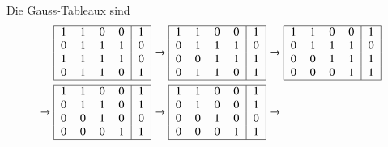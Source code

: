 \begin{loesung}
\begin{teilaufgaben}
\item
Die Gauss-Tableaux sind
\begin{align*}
\begin{tabular}{|>{$}c<{$}>{$}c<{$}>{$}c<{$}>{$}c<{$}|>{$}c<{$}|}
\hline
   1 & 1 & 0 & 0 &  1\\
   0 & 1 & 1 & 1 &  0\\
   1 & 1 & 1 & 1 &  0\\
   0 & 1 & 1 & 0 &  1\\
\hline
\end{tabular}
&\to
\begin{tabular}{|>{$}c<{$}>{$}c<{$}>{$}c<{$}>{$}c<{$}|>{$}c<{$}|}
\hline
   1 & 1 & 0 & 0 &  1\\
   0 & 1 & 1 & 1 &  0\\
   0 & 0 & 1 & 1 &  1\\
   0 & 1 & 1 & 0 &  1\\
\hline
\end{tabular}
\to
\begin{tabular}{|>{$}c<{$}>{$}c<{$}>{$}c<{$}>{$}c<{$}|>{$}c<{$}|}
\hline
   1 & 1 & 0 & 0 &  1\\
   0 & 1 & 1 & 1 &  0\\
   0 & 0 & 1 & 1 &  1\\
   0 & 0 & 0 & 1 &  1\\
\hline
\end{tabular}
\\
\to
\begin{tabular}{|>{$}c<{$}>{$}c<{$}>{$}c<{$}>{$}c<{$}|>{$}c<{$}|}
\hline
   1 & 1 & 0 & 0 &  1\\
   0 & 1 & 1 & 0 &  1\\
   0 & 0 & 1 & 0 &  0\\
   0 & 0 & 0 & 1 &  1\\
\hline
\end{tabular}
&
\to
\begin{tabular}{|>{$}c<{$}>{$}c<{$}>{$}c<{$}>{$}c<{$}|>{$}c<{$}|}
\hline
   1 & 1 & 0 & 0 &  1\\
   0 & 1 & 0 & 0 &  1\\
   0 & 0 & 1 & 0 &  0\\
   0 & 0 & 0 & 1 &  1\\
\hline
\end{tabular}
\to
\begin{tabular}{|>{$}c<{$}>{$}c<{$}>{$}c<{$}>{$}c<{$}|>{$}c<{$}|}

\end{tabular}
\end{align*}
\end{teilaufgaben}
\end{loesung}
